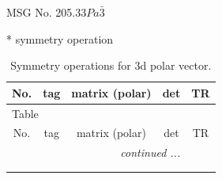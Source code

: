 \documentclass[fleqn,8pt]{jsarticle}
\begin{document}
\setcounter{MaxMatrixCols}{32}

\renewcommand{\tablename}{Table~}
\renewcommand{\figurename}{Figure~}
\begin{center}
\LARGE
MSG No. 205.33\quad$Pa\bar{3}$
\end{center}
* symmetry operation
\renewcommand{\arraystretch}{1.3}
\begin{longtable}{ccccc}
\caption{Symmetry operations for 3d polar vector.}
 \\
 \hline \hline
No. & tag & matrix (polar) & det & TR \\ \hline \endfirsthead

\multicolumn{4}{l}{\tablename\ \thetable{}} \\
 \hline \hline
No. & tag & matrix (polar) & det & TR \\ \hline \endhead

 \hline \hline
\multicolumn{4}{r}{\footnotesize\it continued ...} \\ \endfoot

 \hline \hline
\multicolumn{4}{r}{} \\ \endlastfoot


\end{longtable}
\end{document}
